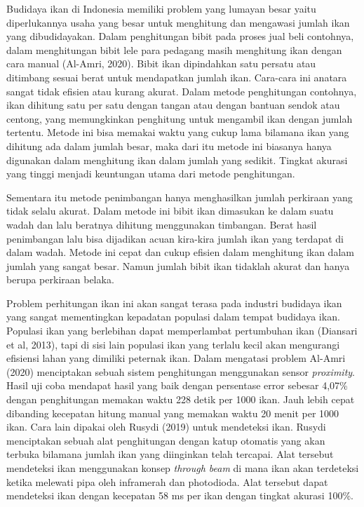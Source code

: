 Budidaya ikan di Indonesia memiliki problem yang lumayan besar yaitu 
diperlukannya usaha yang besar untuk menghitung dan mengawasi jumlah ikan 
yang dibudidayakan. Dalam penghitungan bibit pada proses jual beli contohnya, 
dalam menghitungan bibit lele para pedagang masih menghitung ikan dengan 
cara manual (Al-Amri, 2020). Bibit ikan dipindahkan satu persatu atau 
ditimbang sesuai berat untuk mendapatkan jumlah ikan. Cara-cara ini anatara sangat tidak 
efisien atau kurang akurat. Dalam metode penghitungan contohnya, ikan 
dihitung satu per satu dengan tangan atau dengan bantuan sendok atau centong, 
yang memungkinkan penghitung untuk mengambil ikan dengan jumlah tertentu. 
Metode ini bisa memakai waktu yang cukup lama bilamana ikan yang dihitung 
ada dalam jumlah besar, maka dari itu metode ini biasanya hanya digunakan 
dalam menghitung ikan dalam jumlah yang sedikit. Tingkat akurasi yang 
tinggi menjadi keuntungan utama dari metode penghitungan.

Sementara itu metode penimbangan hanya menghasilkan jumlah perkiraan yang tidak 
selalu akurat. Dalam metode ini bibit ikan dimasukan ke dalam suatu wadah dan lalu 
beratnya dihitung menggunakan timbangan. Berat hasil penimbangan lalu bisa 
dijadikan acuan kira-kira jumlah ikan yang terdapat di dalam wadah. 
Metode ini cepat dan cukup efisien dalam menghitung ikan dalam jumlah yang 
sangat besar. Namun jumlah bibit ikan tidaklah akurat dan hanya berupa perkiraan belaka.

Problem perhitungan ikan ini akan sangat terasa pada industri budidaya ikan yang 
sangat mementingkan kepadatan populasi dalam tempat budidaya ikan. Populasi ikan 
yang berlebihan dapat memperlambat pertumbuhan ikan (Diansari et al, 2013), tapi 
di sisi lain populasi ikan yang terlalu kecil akan mengurangi efisiensi lahan 
yang dimiliki peternak ikan. Dalam mengatasi problem Al-Amri (2020) menciptakan 
sebuah sistem penghitungan menggunakan sensor \emph{proximity}. Hasil uji coba mendapat 
hasil yang baik dengan persentase error sebesar 4,07\% dengan penghitungan 
memakan waktu 228 detik per 1000 ikan. Jauh lebih cepat dibanding kecepatan 
hitung manual yang memakan waktu 20 menit per 1000 ikan. Cara lain dipakai 
oleh Rusydi (2019) untuk mendeteksi ikan. Rusydi menciptakan sebuah alat 
penghitungan dengan katup otomatis yang akan terbuka bilamana jumlah ikan 
yang diinginkan telah tercapai. Alat tersebut mendeteksi ikan menggunakan 
konsep \emph{through beam} di mana ikan akan terdeteksi ketika melewati pipa oleh 
inframerah dan photodioda. Alat tersebut dapat mendeteksi ikan dengan 
kecepatan 58 ms per ikan dengan tingkat akurasi 100\%.

